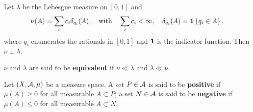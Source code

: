 \begin{example}
    Let $\lambda$ be the Lebesgue measure on $[0,1]$ and 
    \begin{equation*}
        \nu(A) = \sum_i c_i\delta_{q_i}(A), \quad \text{with}\quad 
        \sum_i c_i < \infty, \quad \delta_{q_i}(A) = \mathbf{1}\left\{ {q_i\in A} \right\},
    \end{equation*}
    where $q_i$ enumerates the rationals in $[0,1]$ and $\mathbf{1}$ is the 
    indicator function. Then $\nu\perp\lambda$.
\end{example} 

\begin{definition}
    $\nu$ and $\lambda$ are said to be \textbf{equivalent} if $\nu\ll\lambda$ 
    and $\lambda\ll\nu$.
\end{definition}

\begin{definition}
    Let $(X,\mathcal{A},\mu)$ be a measure space. A set $P\in\mathcal{A}$ is said to be 
    \textbf{positive} if $\mu(A)\geq 0$ for all measurable $A\subset P$; 
    a set $N\in\mathcal{A}$ is said to be \textbf{negative} if $\mu(A)\leq 0$ for 
    all measurable $A\subset N$.
\end{definition}

